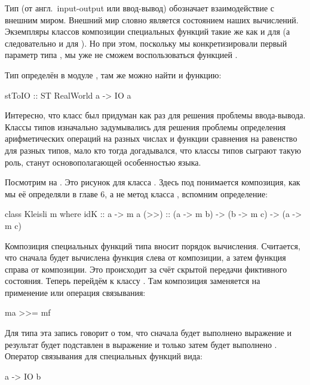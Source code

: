 Тип  (от англ.~input-output или ввод-вывод)
обозначает взаимодействие с внешним миром. 
Внешний мир словно является состоянием наших вычислений.
Экземпляры классов композиции специальных функций 
такие же как и для  (а следовательно и для ).
Но при этом, поскольку мы конкретизировали первый параметр типа
, мы уже не сможем воспользоваться функцией .


Тип  определён в модуле ,
там же можно найти и функцию:

\begin{code}
stToIO :: ST RealWorld a -> IO a
\end{code}

Интересно, что класс  был придуман 
как раз для решения проблемы ввода-вывода. Классы типов
изначально задумывались для решения проблемы 
определения арифметических операций на разных числах
и функции сравнения на равенство для разных типов, 
мало кто тогда догадывался, что классы типов сыграют 
такую роль, станут основополагающей особенностью языка.



Посмотрим на . Это рисунок для класса . 
Здесь под \In{>>} понимается композиция, как мы её определяли
в главе 6, а не метод класса , вспомним определение:

\begin{code}
class Kleisli m where
    idK  :: a -> m a
    (>>) :: (a -> m b) -> (b -> m c) -> (a -> m c)
\end{code}

Композиция специальных функций типа 
вносит порядок вычисления. Считается, что сначала
будет вычислена функция слева от композиции, а
затем функция справа от композиции. Это происходит
за счёт скрытой передачи фиктивного состояния.
Теперь перейдём к классу . Там композиция
заменяется на применение или операция связывания:

\begin{code}
ma >>= mf
\end{code}

Для типа  эта запись говорит о том, что сначала будет выполнено
выражение  и результат будет подставлен в 
выражение  и только затем будет выполнено .
Оператор связывания для специальных функций вида:

\begin{code}
a -> IO b
\end{code}

